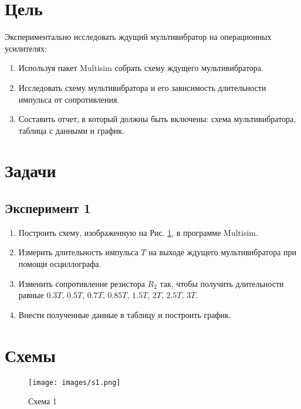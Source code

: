 \documentclass[12pt]{article}
\begin{document}
    \newpage

    \pagestyle{plain}
    \setcounter{page}{1}

    \section*{Цель}

    Экспериментально исследовать ждущий мультивибратор на операционных усилителях:

    \begin{enumerate}
        \item Используя пакет Multisim собрать схему ждущего мультивибратора.

        \item Исследовать схему мультивибратора и его зависимость длительности импульса от сопротивления.

        \item Составить отчет, в который должны быть включены: схема мультивибратора, таблица с данными и график.
    \end{enumerate}

    \section*{Задачи}

    \subsection*{Эксперимент 1}

    \begin{enumerate}
        \item Построить схему, изображенную на Рис. \ref{fig:s:1}, в программе Multisim.
        \item Измерить длительность импульса $T$ на выходе ждущего мультивибратора при помощи осциллографа.
        \item Изменить сопротивление резистора $R_2$ так, чтобы получить длительности равные $0.3T$, $0.5T$, $0.7T$, $0.85T$, $1.5T$, $2T$, $2.5T$, $3T$.
        \item Внести полученные данные в таблицу и построить график.
    \end{enumerate}

    \section*{Схемы}

    \begin{figure}[ht]
        \centering
        \texttt{[image: images/s1.png]}
        \caption{Схема 1}
        \label{fig:s:1}
    \end{figure}
\end{document}
